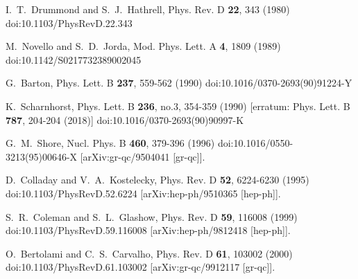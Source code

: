\documentclass[jkps,preprint,fleqn]{revtex4} %
\begin{document}
\begin{thebibliography}{999}

I.~T.~Drummond and S.~J.~Hathrell,
Phys. Rev. D \textbf{22}, 343 (1980)
doi:10.1103/PhysRevD.22.343

M.~Novello and S.~D.~Jorda,
Mod. Phys. Lett. A \textbf{4}, 1809 (1989)
doi:10.1142/S0217732389002045

G.~Barton,
Phys. Lett. B \textbf{237}, 559-562 (1990)
doi:10.1016/0370-2693(90)91224-Y

K.~Scharnhorst,
Phys. Lett. B \textbf{236}, no.3, 354-359 (1990)
[erratum: Phys. Lett. B \textbf{787}, 204-204 (2018)]
doi:10.1016/0370-2693(90)90997-K

G.~M.~Shore,
Nucl. Phys. B \textbf{460}, 379-396 (1996)
doi:10.1016/0550-3213(95)00646-X
[arXiv:gr-qc/9504041 [gr-qc]].

D.~Colladay and V.~A.~Kostelecky,
Phys. Rev. D \textbf{52}, 6224-6230 (1995)
doi:10.1103/PhysRevD.52.6224
[arXiv:hep-ph/9510365 [hep-ph]].

S.~R.~Coleman and S.~L.~Glashow,
Phys. Rev. D \textbf{59}, 116008 (1999)
doi:10.1103/PhysRevD.59.116008
[arXiv:hep-ph/9812418 [hep-ph]].

O.~Bertolami and C.~S.~Carvalho,
Phys. Rev. D \textbf{61}, 103002 (2000)
doi:10.1103/PhysRevD.61.103002
[arXiv:gr-qc/9912117 [gr-qc]].


\end{thebibliography}
\end{document}
